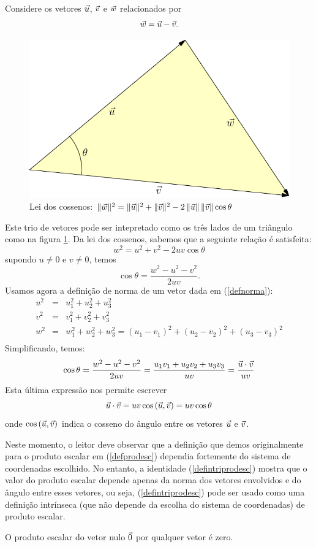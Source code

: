 Considere os vetores $\vec{u}$, $\vec{v}$ e $\vec{w}$ relacionados por $$\vec{w}=\vec{u}-\vec{v}.$$
\begin{figure}\begin{center}
        \includegraphics[width=\textwidth]{./cap_algvet/pics/cossenos} %
    \caption{Lei dos cossenos: $\|\vec{w}\|^2=\|\vec{u}\|^2+\|\vec{v}\|^2-2~\!\|\vec{u}\|~\!\|\vec{v}\|\cos\theta$}\label{leicossenos}
    \end{center}
\end{figure}
Este trio de vetores pode ser intepretado como os três lados de um triângulo como na figura \ref{leicossenos}. Da lei dos cossenos, sabemos que a seguinte relação é satisfeita:
 $$w^2=u^2+v^2-2uv\cos\theta$$
supondo $u\neq 0$ e $v\neq 0$, temos
$$\cos\theta = \frac{w^2-u^2-v^2}{2uv}.$$
Usamos agora a definição de norma de um vetor dada em (\ref{defnorma}):
\begin{eqnarray*}
u^2&=&u_1^2+u_2^2+u_3^2\\
v^2&=&v_1^2+v_2^2+v_3^2\\
w^2&=&w_1^2+w_2^2+w_3^2=\left(u_1-v_1\right)^2+\left(u_2-v_2\right)^2+\left(u_3-v_3\right)^2\\
\end{eqnarray*}
Simplificando, temos:
$$\cos\theta = \frac{w^2-u^2-v^2}{2uv}=\frac{u_1v_1+u_2v_2+u_3v_3}{uv}=\frac{\vec{u}\cdot\vec{v}}{uv}$$
Esta última expressão nos permite escrever
\begin{equation}\label{defintriprodesc}
\vec{u}\cdot\vec{v}=uv\cos\left(\vec{u},\vec{v}\right)=uv\cos\theta
\end{equation}
onde $\cos\left(\vec{u},\vec{v}\right)$ indica o cosseno do ângulo entre os vetores $\vec{u}$ e $\vec{v}$.
\begin{obs}Neste momento, o leitor deve observar que a definição que demos originalmente para o produto escalar em (\ref{defprodesc}) dependia fortemente do sistema de coordenadas escolhido. No entanto, a identidade (\ref{defintriprodesc}) mostra que o valor do produto escalar depende apenas da norma dos vetores envolvidos e do ângulo entre esses vetores, ou seja,  (\ref{defintriprodesc}) pode ser usado como uma definição intrínseca (que não depende da escolha do sistema de coordenadas) de produto escalar. \end{obs}
\begin{obs}O produto escalar do vetor nulo $\vec{0}$ por qualquer vetor é zero.\end{obs}


